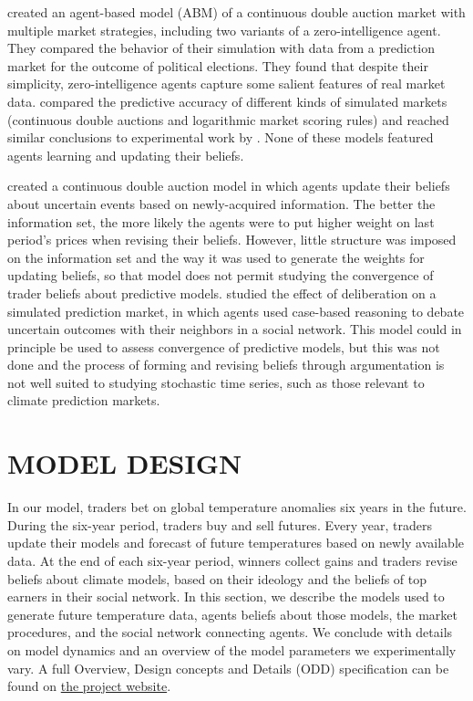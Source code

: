 \documentclass{wscpaperproc}\usepackage[]{graphicx}\usepackage[]{color}
\begin{document}
 created an agent-based model (ABM) of a continuous double auction market with multiple market strategies, including two variants of a zero-intelligence agent. They compared the behavior of their simulation with data from a prediction market for the outcome of political elections. They found that despite their simplicity, zero-intelligence agents capture some salient features of real market data.  compared the predictive accuracy of different kinds of simulated markets (continuous double auctions and logarithmic market scoring rules) and reached similar conclusions to experimental work by . None of these models featured agents learning and updating their beliefs.

 created a continuous double auction model in which agents update their beliefs about uncertain events based on newly-acquired information. The better the information set, the more likely the agents were to put higher weight on last period's prices when revising their beliefs. However, little structure was imposed on the information set and the way it was used to generate the weights for updating beliefs, so that model does not permit studying the convergence of trader beliefs about predictive models.  studied the effect of deliberation on a simulated prediction market, in which agents used case-based reasoning  to debate uncertain outcomes with their neighbors in a social network. This model could in principle be used to assess convergence of predictive models, but this was not done and the process of forming and revising beliefs through argumentation is not well suited to studying stochastic time series, such as those relevant to climate prediction markets.

\section{MODEL DESIGN}

In our model, traders bet on global temperature anomalies six years in the future.
During the six-year period, traders buy and sell futures.
Every year, traders update their models and forecast of future temperatures based on newly available data.
At the end of each six-year period, winners collect gains and traders revise beliefs about climate models, based on their ideology and the beliefs of top earners in their social network.
In this section, we describe the models used to generate future temperature data, agents beliefs about those models, the market procedures, and the social network connecting agents.
We conclude with details on model dynamics and an overview of the model parameters we experimentally vary. A full Overview, Design concepts and Details (ODD) specification can be found on \href{https://github.com/JohnNay/predMarket}{the project website}.
\end{document}
